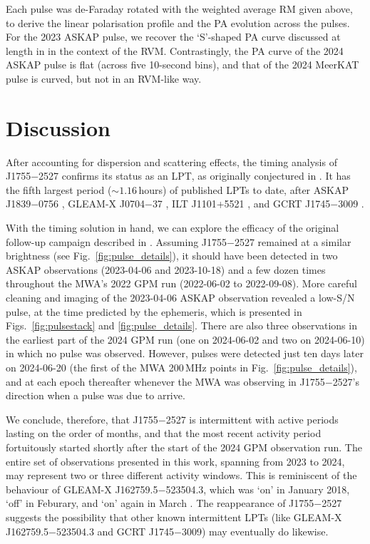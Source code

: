 \documentclass[fleqn,usenatbib]{mnras}
\newcommand{\src}{J1755$-$2527}
\newcommand{\Fig}{Fig.}
\newcommand{\Figs}{Figs.}
\begin{document}
Each pulse was de-Faraday rotated with the weighted average RM given above, to derive the linear polarisation profile and the PA evolution across the pulses.
For the 2023 ASKAP pulse, we recover the `S'-shaped PA curve discussed at length in  in the context of the RVM.
Contrastingly, the PA curve of the 2024 ASKAP pulse is flat (across five 10-second bins), and that of the 2024 MeerKAT pulse is curved, but not in an RVM-like way.

\section{Discussion} \label{sec:discussion}

After accounting for dispersion and scattering effects, the timing analysis of \src{} confirms its status as an LPT, as originally conjectured in .
It has the fifth largest period (${\sim}1.16\,$hours) of published LPTs to date, after ASKAP J1839$-$0756 \citep[$6.45\,$hours;][]{Lee2025}, GLEAM-X J0704$-$37 \citep[$2.92\,$hours;][]{2024ApJ...976L..21H,2025A&A...695L...8R}, ILT J1101+5521 \citep[$2.09\,$hours;][]{deRuiter2025}, and GCRT J1745$-$3009 \citep[$1.28\,$hours;][]{2005Natur.434...50H}.

With the timing solution in hand, we can explore the efficacy of the original follow-up campaign described in .
Assuming \src{} remained at a similar brightness (see \Fig~\ref{fig:pulse_details}), it should have been detected in two ASKAP observations (2023-04-06 and 2023-10-18) and a few dozen times throughout the MWA's 2022 GPM run (2022-06-02 to 2022-09-08).
More careful cleaning and imaging of the 2023-04-06 ASKAP observation revealed a low-S/N pulse, at the time predicted by the ephemeris, which is presented in \Figs~\ref{fig:pulsestack} and \ref{fig:pulse_details}.
There are also three observations in the earliest part of the 2024 GPM run (one on 2024-06-02 and two on 2024-06-10) in which no pulse was observed.
However, pulses were detected just ten days later on 2024-06-20 (the first of the MWA 200\,MHz points in \Fig~\ref{fig:pulse_details}), and at each epoch thereafter whenever the MWA was observing in \src{}'s direction when a pulse was due to arrive.

We conclude, therefore, that \src{} is intermittent with active periods lasting on the order of months, and that the most recent activity period fortuitously started shortly after the start of the 2024 GPM observation run.
The entire set of observations presented in this work, spanning from 2023 to 2024, may represent two or three different activity windows.
This is reminiscent of the behaviour of GLEAM-X J162759.5$-$523504.3, which was `on' in January 2018, `off' in Feburary, and `on' again in March \citep{2022Natur.601..526H}.
The reappearance of \src{} suggests the possibility that other known intermittent LPTs (like GLEAM-X J162759.5$-$523504.3 and GCRT J1745$-$3009) may eventually do likewise.
\end{document}
